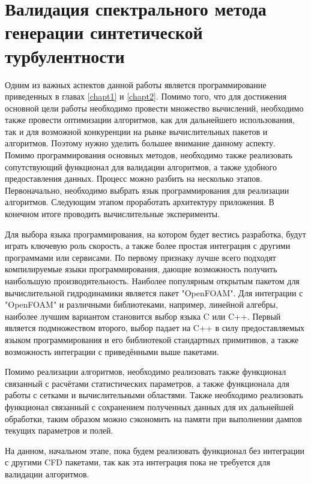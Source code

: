 \chapter{Валидация спектрального метода генерации синтетической турбулентности} \label{chapt4}

Одним из важных аспектов данной работы является программирование приведенных в главах \ref{chapt1} и \ref{chapt2}. Помимо того, что для достижения основной цели работы необходимо провести множество вычислений, необходимо также провести оптимизации алгоритмов, как для дальнейшего использования, так и для возможной конкуренции на рынке вычислительных пакетов и алгоритмов. Поэтому нужно уделить большее внимание данному аспекту. Помимо программирования основных методов, необходимо также реализовать сопутствующий функционал для валидации алгоритмов, а также удобного предоставления данных. Процесс можно разбить на несколько этапов. Первоначально, необходимо выбрать язык программирования для реализации алгоритмов. Следующим этапом проработать архитектуру приложения. В конечном итоге проводить вычислительные эксперименты.

Для выбора языка программирования, на котором будет вестись разработка, будут играть ключевую роль скорость, а также более простая интеграция с другими программами или сервисами. По первому признаку лучше всего подходят компилируемые языки программирования, дающие возможность получить наибольшую производительность. Наиболее популярным открытым пакетом для вычислительной гидродинамики является пакет "OpenFOAM". Для интеграции с "OpenFOAM" и различными библиотеками, например, линейной алгебры, наиболее лучшим вариантом становится выбор языка C или C++. Первый является подмножеством второго, выбор падает на C++ в силу предоставляемых языком программирования и его библиотекой стандартных примитивов, а также возможность интеграции с приведёнными выше пакетами.

Помимо реализации алгоритмов, необходимо реализовать также функционал связанный с расчётами статистических параметров, а также функционала для работы с сетками и вычислительными областями. Также необходимо реализовать функционал связанный с сохранением полученных данных для их дальнейшей обработки, таким образом можно сэкономить на памяти при выполнении дампов текущих параметров и полей. 

На данном, начальном этапе, пока будем реализовать функционал без интеграции с другими CFD пакетами, так как эта интеграция пока не требуется для валидации алгоритмов.

